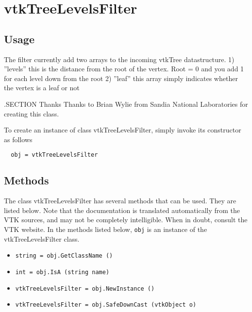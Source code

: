 \section{vtkTreeLevelsFilter}

\subsection{Usage}

 The filter currently add two arrays to the incoming vtkTree datastructure.
 1) ''levels'' this is the distance from the root of the vertex. Root = 0
 and you add 1 for each level down from the root
 2) ''leaf'' this array simply indicates whether the vertex is a leaf or not

 .SECTION Thanks
 Thanks to Brian Wylie from Sandia National Laboratories for creating this
 class.

To create an instance of class vtkTreeLevelsFilter, simply
invoke its constructor as follows
\begin{verbatim}
  obj = vtkTreeLevelsFilter
\end{verbatim}
\subsection{Methods}

The class vtkTreeLevelsFilter has several methods that can be used.
  They are listed below.
Note that the documentation is translated automatically from the VTK sources,
and may not be completely intelligible.  When in doubt, consult the VTK website.
In the methods listed below, \verb|obj| is an instance of the vtkTreeLevelsFilter class.
\begin{itemize}
\item  \verb|string = obj.GetClassName ()|

\item  \verb|int = obj.IsA (string name)|

\item  \verb|vtkTreeLevelsFilter = obj.NewInstance ()|

\item  \verb|vtkTreeLevelsFilter = obj.SafeDownCast (vtkObject o)|

\end{itemize}
